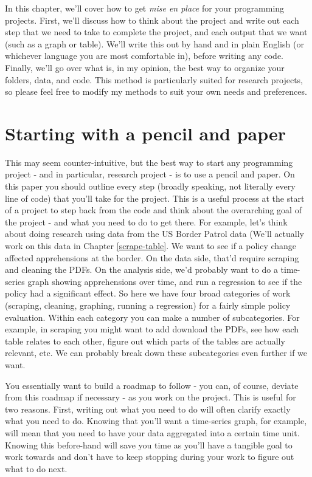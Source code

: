 \documentclass[
]{krantz}
\begin{document}
In this chapter, we'll cover how to get \emph{mise en place} for your programming projects. First, we'll discuss how to think about the project and write out each step that we need to take to complete the project, and each output that we want (such as a graph or table). We'll write this out by hand and in plain English (or whichever language you are most comfortable in), before writing any code. Finally, we'll go over what is, in my opinion, the best way to organize your folders, data, and code. This method is particularly suited for research projects, so please feel free to modify my methods to suit your own needs and preferences.

\hypertarget{starting-with-a-pencil-and-paper}{%
\section{Starting with a pencil and paper}\label{starting-with-a-pencil-and-paper}}

This may seem counter-intuitive, but the best way to start any programming project - and in particular, research project - is to use a pencil and paper. On this paper you should outline every step (broadly speaking, not literally every line of code) that you'll take for the project. This is a useful process at the start of a project to step back from the code and think about the overarching goal of the project - and what you need to do to get there. For example, let's think about doing research using data from the US Border Patrol data (We'll actually work on this data in Chapter \ref{scrape-table}. We want to see if a policy change affected apprehensions at the border. On the data side, that'd require scraping and cleaning the PDFs. On the analysis side, we'd probably want to do a time-series graph showing apprehensions over time, and run a regression to see if the policy had a significant effect. So here we have four broad categories of work (scraping, cleaning, graphing, running a regression) for a fairly simple policy evaluation. Within each category you can make a number of subcategories. For example, in scraping you might want to add download the PDFs, see how each table relates to each other, figure out which parts of the tables are actually relevant, etc. We can probably break down these subcategories even further if we want.

You essentially want to build a roadmap to follow - you can, of course, deviate from this roadmap if necessary - as you work on the project. This is useful for two reasons. First, writing out what you need to do will often clarify exactly what you need to do. Knowing that you'll want a time-series graph, for example, will mean that you need to have your data aggregated into a certain time unit. Knowing this before-hand will save you time as you'll have a tangible goal to work towards and don't have to keep stopping during your work to figure out what to do next.
\end{document}
